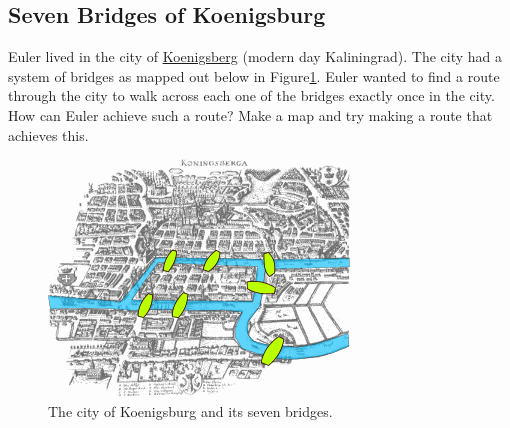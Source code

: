 \documentclass[]{article}
\numberwithin{equation}{section}
\theoremstyle{definition}
\theoremstyle{remark}
\begin{document}
\subsection{Seven Bridges of Koenigsburg }
Euler lived in the city of \href{https://goo.gl/maps/h28p2rEpXZGGkn9M6}{Koenigsberg} (modern day Kaliningrad). The city had a system of bridges as mapped out below in Figure\ref{F:seven-bridges}. 
Euler wanted to find a route through the city to walk across each one of the bridges exactly once in the city. 
How can Euler achieve such a route? Make a map and try making a route that achieves this. 

\begin{figure}[h]
	\begin{center}
		\includegraphics[scale=0.5]{konigsberg_bridges.png}
	\end{center}
\caption{The city of Koenigsburg and its seven bridges.}\label{F:seven-bridges}
\end{figure}
	
\end{document}
